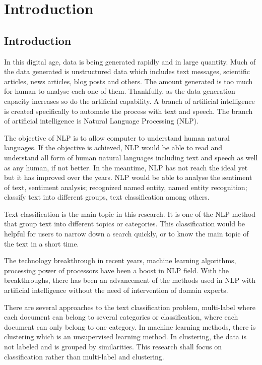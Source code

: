 \chapter{Introduction}
\section{Introduction}
In this digital age, data is being generated rapidly and in large quantity. Much of the data generated is unstructured data which includes text messages, scientific articles, news articles, blog posts and others. \cite{bigData} The amount generated is too much for human to analyse each one of them. Thankfully, as the data generation capacity increases so do the artificial capability. A branch of artificial intelligence is created specifically to automate the process with text and speech. The branch of artificial intelligence is Natural Language Processing (NLP).

The objective of NLP is to allow computer to understand human natural languages. If the objective is achieved, NLP would be able to read and understand all form of human natural languages including text  and speech as well as any human, if not better. In the meantime, NLP has not reach the ideal yet but it has improved over the years. NLP would be able to analyse the sentiment of text, sentiment analysis; recognized named entity, named entity recognition; classify text into different groups, text classification among others.

Text classification is the main topic in this research. It is one of the NLP method that group text into different topics or categories. This classification would be helpful for users to narrow down a search quickly, or to know the main topic of the text in a short time.

The technology breakthrough in recent years, machine learning algorithms, processing power of processors have been a boost in NLP field. With the breakthroughs, there has been an advancement of the methods used in NLP with artificial intelligence without the need of intervention of domain experts.

There are several approaches to the text classification problem, multi-label where each document can belong to several categories or classification, where each document can only belong to one category. In machine learning methods, there is clustering which is an unsupervised learning method. In clustering, the data is not labeled and is grouped by similarities. This research shall focus on classification rather than multi-label and clustering.

